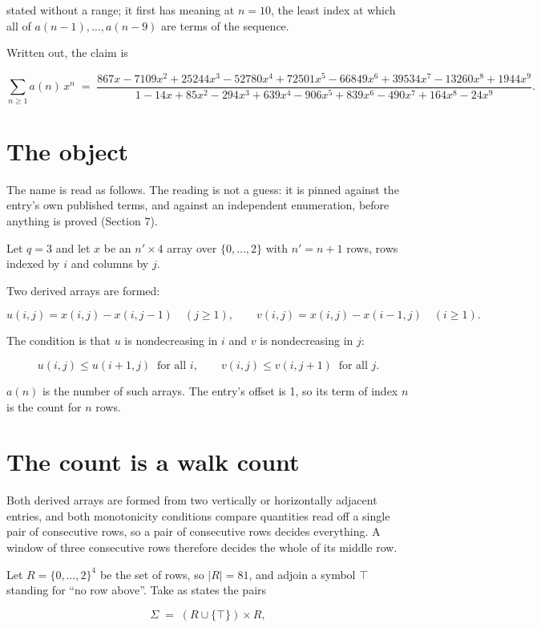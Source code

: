 \documentclass[11pt]{article}
\theoremstyle{definition}
\begin{document}
stated without a range; it first has meaning at $n = 10$, the least index at which all of $a(n-1),\dots,a(n-9)$ are terms of the sequence.

Written out, the claim is

\[\sum_{n \ge 1} a(n)\,x^n \;=\; \frac{867x - 7109x^{2} + 25244x^{3} - 52780x^{4} + 72501x^{5} - 66849x^{6} + 39534x^{7} - 13260x^{8} + 1944x^{9}}{1 - 14x + 85x^{2} - 294x^{3} + 639x^{4} - 906x^{5} + 839x^{6} - 490x^{7} + 164x^{8} - 24x^{9}}.\]

\section{The object}

The name is read as follows. The reading is not a guess: it is pinned against the entry's own published terms, and against an independent enumeration, before anything is proved (Section 7).

Let $q = 3$ and let $x$ be an $n' \times 4$ array over $\{0,\dots,2\}$ with $n' = n + 1$ rows, rows indexed by $i$ and columns by $j$.

Two derived arrays are formed:

\[u(i,j) = x(i,j) - x(i,j{-}1)\quad (j \ge 1), \qquad v(i,j) = x(i,j) - x(i{-}1,j)\quad (i \ge 1).\]

The condition is that $u$ is nondecreasing in $i$ and $v$ is nondecreasing in $j$:

\[u(i,j) \le u(i{+}1,j) \ \text{ for all } i, \qquad v(i,j) \le v(i,j{+}1) \ \text{ for all } j.\]

$a(n)$ is the number of such arrays. The entry's offset is 1, so its term of index $n$ is the count for $n$ rows.

\section{The count is a walk count}

Both derived arrays are formed from two vertically or horizontally adjacent entries, and both monotonicity conditions compare quantities read off a single pair of consecutive rows, so a pair of consecutive rows decides everything. A window of three consecutive rows therefore decides the whole of its middle row.

Let $R = \{0,\dots,2\}^{4}$ be the set of rows, so $|R| = 81$, and adjoin a symbol $\top$ standing for ``no row above''. Take as states the pairs

\[\Sigma \;=\; (R \cup \{\top\}) \times R,\]
\end{document}
